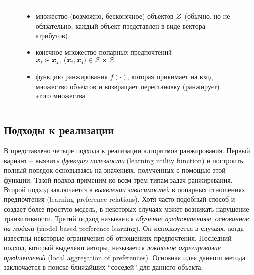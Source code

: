 	\begin{figure}[h!]
		\hrule
		\begin{description}[nosep]
			\item[Дано:] \null\leavevmode
			\begin{itemize}[itemsep=0pt,leftmargin=2ex,label=\textbf{---}]
				\item множество (возможно, бесконечное) объектов $\mathcal{Z}$ (обычно, но не обязательно, каждый объект представлен в виде вектора атрибутов)
				\item конечное множество попарных предпочтений $\bm{x}_i \succ \bm{x}_j, \: (\bm{x}_i, \bm{x}_j) \in \mathcal{Z} \times \mathcal{Z}$
			\end{itemize}
			\item[Найти:] \null\leavevmode
			\begin{itemize}[itemsep=0pt,leftmargin=2ex,label=\textbf{---}]
				\item функцию ранжирования $f(\cdot)$, которая принимает на вход множество объектов и возвращает перестановку (ранжирует) этого множества
			\end{itemize}
		\end{description} 
		\hrule
		\label{fig:object_ranking}
	\end{figure}
	
	\subsection{Подходы к реализации}
	В \cite{plbook:Introduction:2010} представлено четыре подхода к реализации алгоритмов ранжирования. 
	Первый вариант – выявить \emph{функцию полезности} (learning utility function) и построить полный порядок основываясь на значениях, полученных с помощью этой функции. Такой подход применим ко всем трем типам задач ранжирования. 
	Второй подход заключается в \emph{выявлении зависимостей} в попарных отношениях предпочтения (learning preference relations). Хотя часто подобный способ и создает более простую модель, в некоторых случаях может возникать нарушение транзитивности\cite[с.~10]{plbook:Introduction:2010}. 
	Третий подход называется \emph{обучение предпочтениям, основанное на модели} (model-based preference learning). Он используется в случаях, когда известны некоторые ограничения об отношениях предпочтения. 
	Последний подход, который выделяют авторы, называется \emph{локальное агрегирование предпочтений} (local aggregation of preferences). Основная идея данного метода заключается в поиске ближайших \enquote{соседей} для данного объекта.
	
